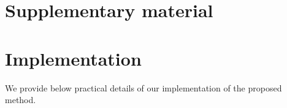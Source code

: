 \appendix

\section*{Supplementary material}

\section{Implementation}
\label{implDetails}

\noindent
We provide below practical details of our implementation of the proposed method.

